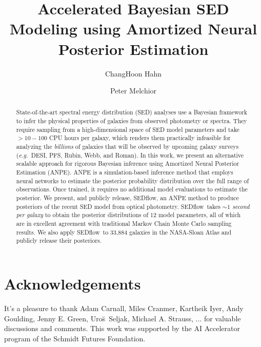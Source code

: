 \documentclass[12pt, letterpaper, preprint, comicneue]{aastex63}
\newcommand{\eg}{\emph{e.g.}}
\newcommand{\sedflow}{{\sc SEDflow}}
\newcommand{\peter}[1]{{\color{red}#1}}
\begin{document}
 \sloppy\sloppypar\frenchspacing 

\title{Accelerated Bayesian SED Modeling using Amortized Neural Posterior Estimation}

\author[0000-0003-1197-0902]{ChangHoon Hahn}

\author[0000-0002-8873-5065]{Peter Melchior}

\begin{abstract}
    State-of-the-art spectral energy distribution (SED) analyses use a
    Bayesian framework to infer the physical properties of galaxies from
    observed photometry or spectra.
    They require sampling from a high-dimensional space of SED model parameters
    and take $>10-100$ CPU hours per galaxy, which renders them practically
    infeasible for analyzing the {\em billions} of galaxies that will be
    observed by upcoming galaxy surveys (\eg~DESI, PFS, Rubin, Webb, and Roman).
    In this work, we present an alternative scalable approach for
    rigorous Bayesian inference using Amortized Neural Posterior
    Estimation (ANPE). 
    ANPE is a simulation-based inference method that employs neural networks
    to estimate the posterior probability distribution over the full
    range of observations.
    Once trained, it requires no additional model evaluations to estimate the
    posterior.  
    We present, and publicly release, \sedflow, an ANPE method to produce
    posteriors of the recent \cite{hahn2022} SED model from optical
    photometry.
    \sedflow~takes \emph{${\sim}1$ second per galaxy} to obtain the posterior
    distributions of 12 model parameters, all of which are in excellent
    agreement with traditional Markov Chain Monte Carlo sampling results.
    We also apply \sedflow~to 33,884 galaxies in the NASA-Sloan Atlas and
    publicly release their posteriors.
\end{abstract}









\section*{Acknowledgements}
\peter{
It's a pleasure to thank 
    Adam Carnall, 
    Miles Cranmer, 
    Kartheik Iyer,
    Andy Goulding,
    Jenny E. Green,
    Uro{\u s}~Seljak,
    Michael A. Strauss, 
    ...
for valuable discussions and comments.}
This work was supported by the AI Accelerator program of the Schmidt Futures Foundation.

\appendix

%
 
\end{document}
